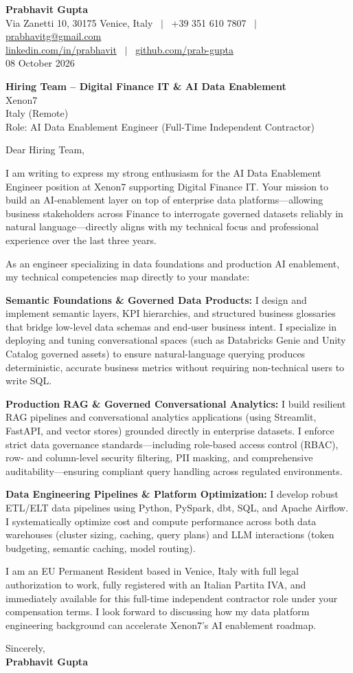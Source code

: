 \documentclass[10.5pt,a4paper]{article}
\begin{document}
\textbf{\large Prabhavit Gupta}\\
Via Zanetti 10, 30175 Venice, Italy ~$\vert$~ +39 351 610 7807 ~$\vert$~ \href{mailto:prabhavitg@gmail.com}{prabhavitg@gmail.com}\\
\href{https://www.linkedin.com/in/prabhavit/}{linkedin.com/in/prabhavit} ~$\vert$~ \href{https://github.com/prab-gupta}{github.com/prab-gupta}\\
08 October 2026

\textbf{Hiring Team -- Digital Finance IT \& AI Data Enablement}\\
Xenon7\\
Italy (Remote)\\
Role: AI Data Enablement Engineer (Full-Time Independent Contractor)

Dear Hiring Team,

I am writing to express my strong enthusiasm for the AI Data Enablement Engineer position at Xenon7 supporting Digital Finance IT. Your mission to build an AI-enablement layer on top of enterprise data platforms---allowing business stakeholders across Finance to interrogate governed datasets reliably in natural language---directly aligns with my technical focus and professional experience over the last three years.

As an engineer specializing in data foundations and production AI enablement, my technical competencies map directly to your mandate:

\textbf{Semantic Foundations \& Governed Data Products:} I design and implement semantic layers, KPI hierarchies, and structured business glossaries that bridge low-level data schemas and end-user business intent. I specialize in deploying and tuning conversational spaces (such as Databricks Genie and Unity Catalog governed assets) to ensure natural-language querying produces deterministic, accurate business metrics without requiring non-technical users to write SQL.

\textbf{Production RAG \& Governed Conversational Analytics:} I build resilient RAG pipelines and conversational analytics applications (using Streamlit, FastAPI, and vector stores) grounded directly in enterprise datasets. I enforce strict data governance standards---including role-based access control (RBAC), row- and column-level security filtering, PII masking, and comprehensive auditability---ensuring compliant query handling across regulated environments.

\textbf{Data Engineering Pipelines \& Platform Optimization:} I develop robust ETL/ELT data pipelines using Python, PySpark, dbt, SQL, and Apache Airflow. I systematically optimize cost and compute performance across both data warehouses (cluster sizing, caching, query plans) and LLM interactions (token budgeting, semantic caching, model routing).

I am an EU Permanent Resident based in Venice, Italy with full legal authorization to work, fully registered with an Italian Partita IVA, and immediately available for this full-time independent contractor role under your compensation terms. I look forward to discussing how my data platform engineering background can accelerate Xenon7's AI enablement roadmap.

Sincerely,\\
\textbf{Prabhavit Gupta}
\end{document}

